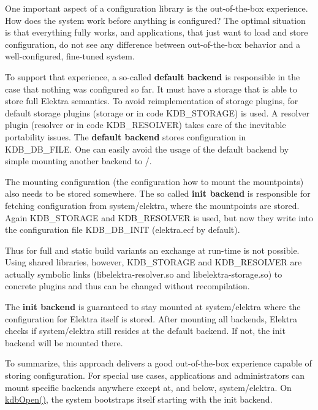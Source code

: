 One important aspect of a configuration library is the out-\/of-\/the-\/box experience. How does the system work before anything is configured? The optimal situation is that everything fully works, and applications, that just want to load and store configuration, do not see any difference between out-\/of-\/the-\/box behavior and a well-\/configured, fine-\/tuned system.

To support that experience, a so-\/called {\bfseries default backend} is responsible in the case that nothing was configured so far. It must have a storage that is able to store full Elektra semantics. To avoid reimplementation of storage plugins, for default storage plugins ({\ttfamily storage} or in code {\ttfamily K\+D\+B\+\_\+\+S\+T\+O\+R\+A\+GE}) is used. A resolver plugin ({\ttfamily resolver} or in code {\ttfamily K\+D\+B\+\_\+\+R\+E\+S\+O\+L\+V\+ER}) takes care of the inevitable portability issues. The {\bfseries default backend} stores configuration in {\ttfamily K\+D\+B\+\_\+\+D\+B\+\_\+\+F\+I\+LE}. One can easily avoid the usage of the default backend by simple mounting another backend to {\ttfamily /}.

The mounting configuration (the configuration how to mount the mountpoints) also needs to be stored somewhere. The so called {\bfseries init backend} is responsible for fetching configuration from {\ttfamily system/elektra}, where the mountpoints are stored. Again {\ttfamily K\+D\+B\+\_\+\+S\+T\+O\+R\+A\+GE} and {\ttfamily K\+D\+B\+\_\+\+R\+E\+S\+O\+L\+V\+ER} is used, but now they write into the configuration file {\ttfamily K\+D\+B\+\_\+\+D\+B\+\_\+\+I\+N\+IT} (elektra.\+ecf by default).

Thus for full and static build variants an exchange at run-\/time is not possible. Using shared libraries, however, {\ttfamily K\+D\+B\+\_\+\+S\+T\+O\+R\+A\+GE} and {\ttfamily K\+D\+B\+\_\+\+R\+E\+S\+O\+L\+V\+ER} are actually symbolic links ({\ttfamily libelektra-\/resolver.\+so} and {\ttfamily libelektra-\/storage.\+so}) to concrete plugins and thus can be changed without recompilation.

The {\bfseries init backend} is guaranteed to stay mounted at {\ttfamily system/elektra} where the configuration for Elektra itself is stored. After mounting all backends, Elektra checks if {\ttfamily system/elektra} still resides at the default backend. If not, the init backend will be mounted there.

To summarize, this approach delivers a good out-\/of-\/the-\/box experience capable of storing configuration. For special use cases, applications and administrators can mount specific backends anywhere except at, and below, {\ttfamily system/elektra}. On {\ttfamily \hyperlink{group__kdb_ga6808defe5870f328dd17910aacbdc6ca}{kdb\+Open()}}, the system bootstraps itself starting with the init backend.

